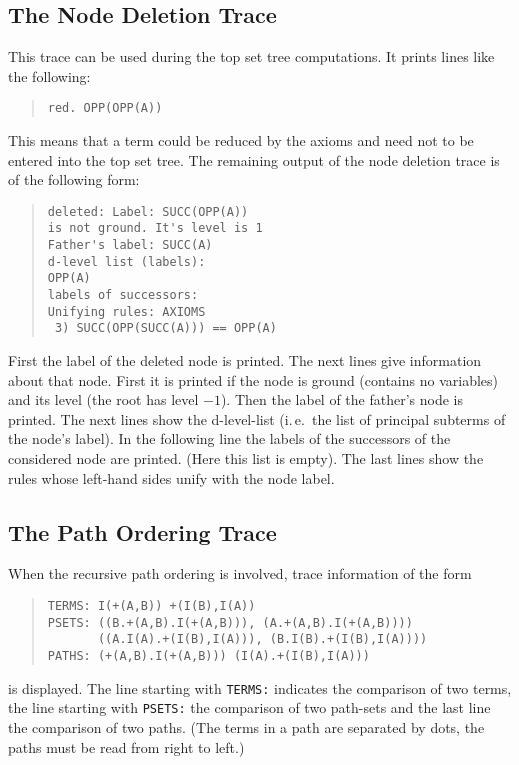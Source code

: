 \subsection{The Node Deletion Trace}
This trace can be used during the top set tree computations.
It prints lines like the following:
\begin{quote}
\begin{verbatim}
red. OPP(OPP(A))
\end{verbatim}
\end{quote}
This means that a term could be reduced by the axioms and need not
to be entered into the top set tree. The remaining output of the node
deletion trace is of the following form:
\begin{quote}   
\begin{verbatim}
deleted: Label: SUCC(OPP(A))
is not ground. It's level is 1
Father's label: SUCC(A)
d-level list (labels): 
OPP(A)  
labels of successors: 
Unifying rules: AXIOMS
 3) SUCC(OPP(SUCC(A))) == OPP(A)
\end{verbatim}
\end{quote}
First the label of the deleted node is printed. The next lines give
information about that node. First it is printed if the node is ground 
(contains no variables) and its level (the root has level $-1$). Then
the label of the father's node is printed. The next lines show the
d-level-list (i.\,e.\  the list of principal subterms of the node's label).
In the following line the labels of the successors of the
considered node are printed. (Here this list is empty). 
The last lines show the rules whose left-hand sides unify with the node
label.

\subsection{The Path Ordering Trace}
When the recursive path ordering is involved, trace information of the
form
\begin{quote}
\begin{verbatim}
TERMS: I(+(A,B)) +(I(B),I(A))
PSETS: ((B.+(A,B).I(+(A,B))), (A.+(A,B).I(+(A,B))))
       ((A.I(A).+(I(B),I(A))), (B.I(B).+(I(B),I(A))))
PATHS: (+(A,B).I(+(A,B))) (I(A).+(I(B),I(A)))
\end{verbatim} 
\end{quote}
is displayed. The line starting with {\tt TERMS:} indicates the
comparison of two terms, the line starting with {\tt PSETS:} the
comparison of two path-sets and the last line the comparison of two
paths. (The terms in a path are separated by dots, the paths must be
read from right to left.)

